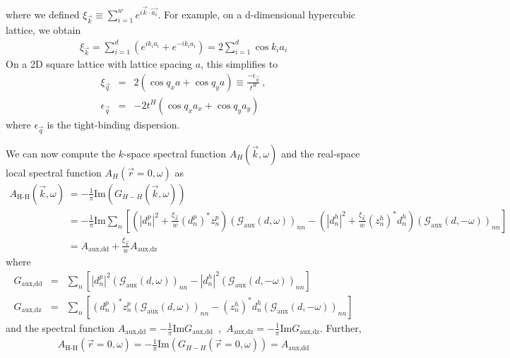 \documentclass{report}
\numberwithin{equation}{section}
\begin{document}
where we defined \(\xi_{\vec k} \equiv \sum_{i=1}^w e^{i \vec{k}\cdot\vec {a_i}}\). For example, on a d-dimensional hypercubic lattice, we obtain
\begin{equation}\begin{aligned}
	\xi_{\vec k} = \sum_{i=1}^d \left(e^{i k_i {a_i}} + e^{-i k_i {a_i}}\right) = 2\sum_{i=1}^d \cos k_i a_i
\end{aligned}\end{equation}
On a 2D square lattice with lattice spacing $a$, this simplifies to
\begin{eqnarray}
	\label{2dsquaretb}
\xi_{\vec{q}} &=& 2(\cos q_{x}a + \cos q_{y}a)\equiv \frac{-\epsilon_{\vec{q}}}{t^{H}}~,\nonumber\\
\epsilon_{\vec{q}} &=& -2t^{H}(\cos q_{x}a_{x} + \cos q_{y}a_{y})~
\end{eqnarray}
where \(\epsilon_{\vec{q}}\) is the tight-binding dispersion.

We can now compute the $k$-space spectral function $A_{H}(\vec{k},\omega)$ and the real-space local spectral function $A_{H}(\vec{r}=0,\omega)$ as
\begin{equation}\begin{aligned}
	A_\text{H-H}(\vec{k},\omega) &= -\frac{1}{\pi} \textrm{Im}(G_{H-H}(\vec{k},\omega))\\ 
	&= -\frac{1}{\pi} \textrm{Im}\sum_n\left[\left(|d^p_n|^2 + \frac{\xi_{\vec k}}{w}\left(d^p_n\right)^* z^p_n\right) \left(\mathcal{G}_\text{aux}(d, \omega)\right)_{nn} - \left(|d^h_n|^2 + \frac{\xi_{\vec k}}{w}\left(z^h_n\right)^* d^h_n\right)\left(\mathcal{G}_\text{aux}(d, -\omega)\right)_{nn}\right]\\
	&= A_\text{aux,dd} + \frac{\xi_{\vec k}}{w} A_\text{aux,dz}
\end{aligned}\end{equation}
where 
\begin{eqnarray}
G_\text{aux,dd} &=& \sum_n\left[|d^p_n|^2 \left(\mathcal{G}_\text{aux}(d, \omega)\right)_{nn} - |d^h_n|^2 \left(\mathcal{G}_\text{aux}(d, -\omega)\right)_{nn}\right]\nonumber\\
G_\text{aux,dz} &=& \sum_n\left[\left(d^p_n\right)^* z^p_n \left(\mathcal{G}_\text{aux}(d, \omega)\right)_{nn} - \left(z^h_n\right)^* d^h_n \left(\mathcal{G}_\text{aux}(d, -\omega)\right)_{nn}\right]
\end{eqnarray}
and the spectral function $A_\text{aux,dd}=-\frac{1}{\pi}\textrm{Im}G_\text{aux,dd}$~,~$A_\text{aux,dz}=-\frac{1}{\pi}\textrm{Im}G_\text{aux,dz}$.
Further,
\begin{equation}\begin{aligned}
A_\text{H-H}(\vec{r}=0,\omega) = -\frac{1}{\pi} \textrm{Im}(G_{H-H}(\vec{r}=0,\omega)) 
= A_\text{aux,dd}
\label{main}
\end{aligned}\end{equation}
\end{document}
